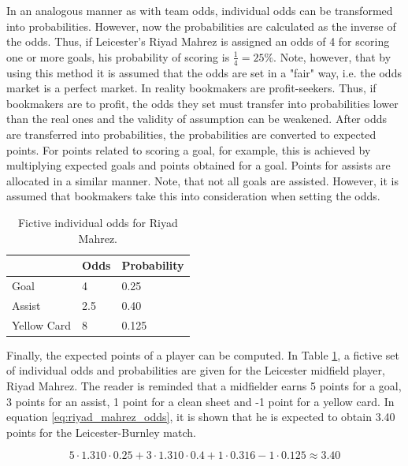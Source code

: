 In an analogous manner as with team odds, individual odds can be transformed into probabilities. However, now the probabilities are calculated as the inverse of the odds. Thus, if Leicester's Riyad Mahrez is assigned an odds of 4 for scoring one or more goals, his probability of scoring is $\frac{1}{4}=25\%$. Note, however, that by using this method it is assumed that the odds are set in a "fair" way, i.e. the odds market is a perfect market. In reality bookmakers are profit-seekers. Thus, if bookmakers are to profit, the odds they set must transfer into probabilities lower than the real ones and the validity of assumption can be weakened. After odds are transferred into probabilities, the probabilities are converted to expected points. For points related to scoring a goal, for example, this is achieved by multiplying expected goals and points obtained for a goal. Points for assists are allocated in a similar manner. Note, that not all goals are assisted. However, it is assumed that bookmakers take this into consideration when setting the odds.

\begin{table}[H]
\centering
\begin{tabular}{@{}lll@{}}
\toprule
            & Odds & Probability \\ 
            \midrule
Goal        & 4    & 0.25        \\
Assist      & 2.5  & 0.40         \\
Yellow Card & 8    & 0.125       \\ 
\bottomrule
\end{tabular}
\caption{Fictive individual odds for Riyad Mahrez.}
\label{tab:ind_odds_riyad_mahrez}
\end{table}


Finally, the expected points of a player can be computed. In Table \ref{tab:ind_odds_riyad_mahrez}, a fictive set of individual odds and probabilities are given for the Leicester midfield player, Riyad Mahrez. The reader is reminded that a midfielder earns 5 points for a goal, 3 points for an assist, 1 point for a clean sheet and -1 point for a yellow card. In equation \ref{eq:riyad_mahrez_odds}, it is shown that he is expected to obtain 3.40 points for the Leicester-Burnley match.


\begin{equation} \label{eq:riyad_mahrez_odds}
    5 \cdot 1.310 \cdot 0.25 + 3 \cdot 1.310 \cdot 0.4 + 1 \cdot 0.316 - 1 \cdot 0.125 \approx 3.40
\end{equation}

